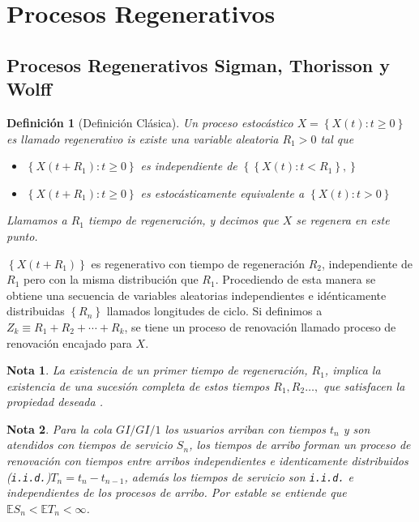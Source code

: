 \documentclass{article}
\newtheorem{Def}{Definición}
\newtheorem{Note}{Nota}
\newcommand{\esp}{\mathbb{E}}
\begin{document}
\section{Procesos Regenerativos}

\subsection{Procesos Regenerativos Sigman, Thorisson y Wolff \cite{Sigman2}}


\begin{Def}[Definici\'on Cl\'asica]
Un proceso estoc\'astico $X=\left\{X\left(t\right):t\geq0\right\}$ es llamado regenerativo is existe una variable aleatoria $R_{1}>0$ tal que
\begin{itemize}
\item[i)] $\left\{X\left(t+R_{1}\right):t\geq0\right\}$ es independiente de $\left\{\left\{X\left(t\right):t<R_{1}\right\},\right\}$
\item[ii)] $\left\{X\left(t+R_{1}\right):t\geq0\right\}$ es estoc\'asticamente equivalente a $\left\{X\left(t\right):t>0\right\}$
\end{itemize}

Llamamos a $R_{1}$ tiempo de regeneraci\'on, y decimos que $X$ se regenera en este punto.
\end{Def}

$\left\{X\left(t+R_{1}\right)\right\}$ es regenerativo con tiempo de regeneraci\'on $R_{2}$, independiente de $R_{1}$ pero con la misma distribuci\'on que $R_{1}$. Procediendo de esta manera se obtiene una secuencia de variables aleatorias independientes e id\'enticamente distribuidas $\left\{R_{n}\right\}$ llamados longitudes de ciclo. Si definimos a $Z_{k}\equiv R_{1}+R_{2}+\cdots+R_{k}$, se tiene un proceso de renovaci\'on llamado proceso de renovaci\'on encajado para $X$.


\begin{Note}
La existencia de un primer tiempo de regeneraci\'on, $R_{1}$, implica la existencia de una sucesi\'on completa de estos tiempos $R_{1},R_{2}\ldots,$ que satisfacen la propiedad deseada \cite{Sigman2}.
\end{Note}


\begin{Note} Para la cola $GI/GI/1$ los usuarios arriban con tiempos $t_{n}$ y son atendidos con tiempos de servicio $S_{n}$, los tiempos de arribo forman un proceso de renovaci\'on  con tiempos entre arribos independientes e identicamente distribuidos (\texttt{i.i.d.})$T_{n}=t_{n}-t_{n-1}$, adem\'as los tiempos de servicio son \texttt{i.i.d.} e independientes de los procesos de arribo. Por \textit{estable} se entiende que $\esp S_{n}<\esp T_{n}<\infty$.
\end{Note}
 
\end{document}
